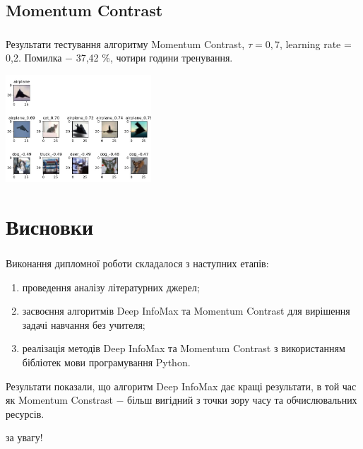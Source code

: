 \documentclass[c]{beamer}
\begin{document}
\subsection{Momentum Contrast}

\begin{frame}
	\frametitle{\insertsection}
	\framesubtitle{\insertsubsection}

	Результати тестування алгоритму Momentum Contrast, $\tau = 0,7$, learning rate = 0,2. Помилка $-$ 37,42 \%, чотири години тренування.
	
    \includegraphics[width=\textwidth, height=4cm, natwidth=621, natheight=456]{mocodemo3.jpg}

\end{frame}

\section{Висновки}

\begin{frame}
	\frametitle{\insertsection}
	Виконання дипломної роботи складалося з наступних етапів:\pause

	\begin{enumerate}
		\item проведення аналізу літературних джерел;\pause
		\item засвоєння алгоритмів Deep InfoMax та Momentum Contrast для вирішення задачі навчання без учителя;\pause
		\item реалізація методів Deep InfoMax та Momentum Contrast з використанням бібліотек мови програмування Python.\pause
	\end{enumerate}

	Результати показали, що алгоритм Deep InfoMax дає кращі результати, в той час як Momentum Constrast $-$ більш вигідний з точки зору часу та обчислювальних ресурсів.
\end{frame}

\begin{frame}
	\centering{} за увагу!
\end{frame}
\end{document}
